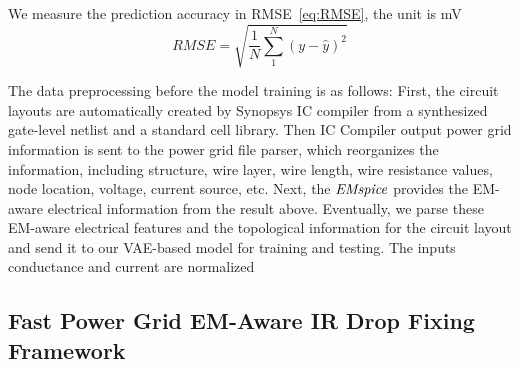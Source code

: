 We measure the prediction accuracy in RMSE~\eqref{eq:RMSE}, the unit is mV
\begin{equation}
	\label{eq:RMSE}
	\textit{RMSE} =\sqrt{ \frac{1}{N} \sum_{1}^{N} ( y - \hat{y})^{2} }
\end{equation}






The data preprocessing before the model training is as follows:
First, the circuit layouts are automatically created by Synopsys IC compiler from a synthesized gate-level netlist and a standard cell library. 
Then IC Compiler output power grid information is sent to the power grid file parser, which reorganizes the information, including structure, wire layer, wire length, wire resistance values, node location, voltage, current source, etc.
Next, the $\it{EMspice}$ provides the EM-aware electrical information from the result above.
Eventually, we parse these EM-aware electrical features and the topological information for the circuit layout and send it to our VAE-based model for training and testing.  The inputs conductance and current are normalized

\begin{table}[!htbp]
	\begin{center}
		\caption{Power Grid Designs Detail}
		\label{table:pg_detail}
		\center
	\end{center}
	\vspace{-0.1in}
\end{table}




\subsection{Fast Power Grid EM-Aware IR Drop Fixing Framework }
\label{subsec:formulation}

